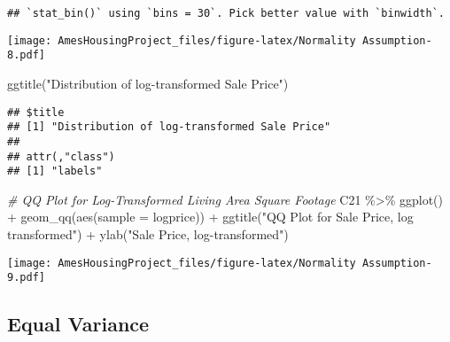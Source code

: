 \documentclass[
]{article}
\newenvironment{Shaded}{\begin{snugshade}}{\end{snugshade}}
\newcommand{\AttributeTok}[1]{\textcolor[rgb]{0.77,0.63,0.00}{#1}}
\newcommand{\CommentTok}[1]{\textcolor[rgb]{0.56,0.35,0.01}{\textit{#1}}}
\newcommand{\FunctionTok}[1]{\textcolor[rgb]{0.00,0.00,0.00}{#1}}
\newcommand{\NormalTok}[1]{#1}
\newcommand{\SpecialCharTok}[1]{\textcolor[rgb]{0.00,0.00,0.00}{#1}}
\newcommand{\StringTok}[1]{\textcolor[rgb]{0.31,0.60,0.02}{#1}}
\begin{document}
\begin{verbatim}
## `stat_bin()` using `bins = 30`. Pick better value with `binwidth`.
\end{verbatim}

\texttt{[image: AmesHousingProject\_files/figure-latex/Normality Assumption-8.pdf]}

\begin{Shaded}
\begin{Highlighting}[]
  \FunctionTok{ggtitle}\NormalTok{(}\StringTok{"Distribution of log{-}transformed Sale Price"}\NormalTok{)}
\end{Highlighting}
\end{Shaded}

\begin{verbatim}
## $title
## [1] "Distribution of log-transformed Sale Price"
## 
## attr(,"class")
## [1] "labels"
\end{verbatim}

\begin{Shaded}
\begin{Highlighting}[]
\CommentTok{\# QQ Plot for Log{-}Transformed Living Area Square Footage}
\NormalTok{C21 }\SpecialCharTok{\%\textgreater{}\%} \FunctionTok{ggplot}\NormalTok{() }\SpecialCharTok{+} \FunctionTok{geom\_qq}\NormalTok{(}\FunctionTok{aes}\NormalTok{(}\AttributeTok{sample =}\NormalTok{ logprice)) }\SpecialCharTok{+} 
  \FunctionTok{ggtitle}\NormalTok{(}\StringTok{"QQ Plot for Sale Price, log transformed"}\NormalTok{) }\SpecialCharTok{+} 
  \FunctionTok{ylab}\NormalTok{(}\StringTok{"Sale Price, log{-}transformed"}\NormalTok{)}
\end{Highlighting}
\end{Shaded}

\texttt{[image: AmesHousingProject\_files/figure-latex/Normality Assumption-9.pdf]}

\hypertarget{equal-variance}{%
\subsection{Equal Variance}\label{equal-variance}}
\end{document}
